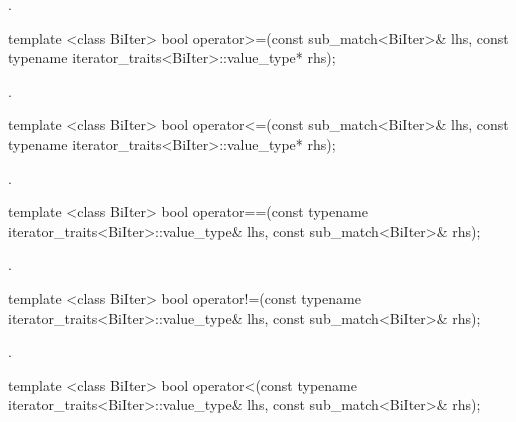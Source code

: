 \begin{itemdescr}
\pnum\returns {}.
\end{itemdescr}

%
\begin{itemdecl}
template <class BiIter>
  bool operator>=(const sub_match<BiIter>& lhs,
                  const typename iterator_traits<BiIter>::value_type* rhs);
\end{itemdecl}

\begin{itemdescr}
\pnum\returns {}.
\end{itemdescr}

%
\begin{itemdecl}
template <class BiIter>
  bool operator<=(const sub_match<BiIter>& lhs,
                  const typename iterator_traits<BiIter>::value_type* rhs);
\end{itemdecl}

\begin{itemdescr}
\pnum
\returns {}.
\end{itemdescr}

%
\begin{itemdecl}
template <class BiIter>
  bool operator==(const typename iterator_traits<BiIter>::value_type& lhs,
                  const sub_match<BiIter>& rhs);
\end{itemdecl}

\begin{itemdescr}
\pnum
\returns {}.
\end{itemdescr}

%
\begin{itemdecl}
template <class BiIter>
  bool operator!=(const typename iterator_traits<BiIter>::value_type& lhs,
                  const sub_match<BiIter>& rhs);
\end{itemdecl}

\begin{itemdescr}
\pnum
\returns {}.
\end{itemdescr}

%
\begin{itemdecl}
template <class BiIter>
  bool operator<(const typename iterator_traits<BiIter>::value_type& lhs,
                 const sub_match<BiIter>& rhs);
\end{itemdecl}

